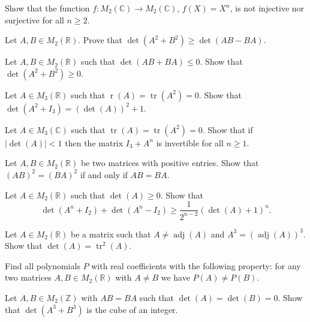 \documentclass[12pt]{article}
\begin{document}
\begin{problem}
Show that the function $f:M_2(\mathbb{C})\to M_2(\mathbb{C})$, $f(X)=X^n$, is not injective nor surjective for all $n\ge 2$.
\end{problem}

\begin{problem}
Let $A,B\in M_2(\mathbb{R})$. Prove that $\det(A^2+B^2) \ge \det(AB-BA)$.
\end{problem}

\begin{problem}
Let $A,B\in M_2(\mathbb{R})$ such that $\det(AB+BA)\le 0$. Show that $\det(A^2+B^2)\ge 0$.
\end{problem}

\begin{problem}
Let $A\in M_3(\mathbb{R})$ such that $\operatorname{r}(A)=\operatorname{tr}(A^2)=0$. Show that $\det(A^2+I_3) = (\det(A))^2+1$.
\end{problem}

\begin{problem}
Let $A\in M_3(\mathbb{C})$ such that $\operatorname{tr}(A)=\operatorname{tr}(A^2)=0$. Show that if $|\det(A)|<1$ then the matrix $I_3+A^n$ is invertible for all $n\ge 1$.
\end{problem}

\begin{problem}
Let $A,B\in M_2(\mathbb{R})$ be two matrices with positive entries. Show that $(AB)^2=(BA)^2$ if and only if $AB=BA$.
\end{problem}

\begin{problem}
Let $A\in M_2(\mathbb{R})$ such that $\det(A)\ge 0$. Show that
\[
\det(A^n+I_2) + \det(A^n-I_2) \ge \frac{1}{2^{n-2}}(\det(A)+1)^n.
\]
\end{problem}

\begin{problem}
Let $A\in M_2(\mathbb{R})$ be a matrix such that $A\ne\operatorname{adj}(A)$ and $A^3 = (\operatorname{adj}(A))^3$. Show that $\det(A)=\operatorname{tr}^2(A)$.
\end{problem}

\begin{problem}
Find all polynomials $P$ with real coefficients with the following property: for any two matrices $A,B\in M_2(\mathbb{R})$ with $A\ne B$ we have $P(A)\ne P(B)$.
\end{problem}

\begin{problem}
Let $A,B\in M_2(\mathbb{Z})$ with $AB=BA$ such that $\det(A)=\det(B)=0$. Show that $\det(A^3+B^3)$ is the cube of an integer.
\end{problem}
\end{document}
